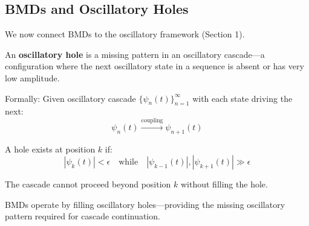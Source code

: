 \subsection{BMDs and Oscillatory Holes}

We now connect BMDs to the oscillatory framework (Section 1).

\begin{definition}
\label{def:oscillatory_hole}
An \textbf{oscillatory hole} is a missing pattern in an oscillatory cascade—a configuration where the next oscillatory state in a sequence is absent or has very low amplitude.

Formally: Given oscillatory cascade $\{\psi_n(t)\}_{n=1}^{\infty}$ with each state driving the next:
\begin{equation}
\psi_n(t) \xrightarrow{\text{coupling}} \psi_{n+1}(t)
\end{equation}

A hole exists at position $k$ if:
\begin{equation}
|\psi_k(t)| < \epsilon \quad \text{while} \quad |\psi_{k-1}(t)|, |\psi_{k+1}(t)| \gg \epsilon
\end{equation}

The cascade cannot proceed beyond position $k$ without filling the hole.
\end{definition}

\begin{theorem}
\label{thm:bmd_hole_filling}
BMDs operate by filling oscillatory holes—providing the missing oscillatory pattern required for cascade continuation.
\end{theorem}

